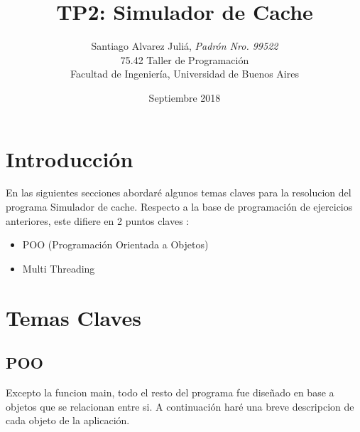 \documentclass[a4paper,12pt]{report}
\title{	TP2: Simulador de Cache}
\author{	Santiago Alvarez Juli\'a, \textit{Padr\'on Nro. 99522}                     \\
            \normalsize{75.42 Taller de Programaci\'on}                             \\
            \normalsize{Facultad de Ingenier\'ia, Universidad de Buenos Aires}            \\
       }
\date{Septiembre 2018}
\begin{document}
\maketitle

\thispagestyle{empty}

\tableofcontents
\newpage
{}

\section{Introducci\'on}

En las siguientes secciones abordar\'e algunos temas claves para la resolucion del programa Simulador de cache. Respecto a la base de programaci\'on de ejercicios anteriores, este difiere en 2 puntos claves :

\begin{itemize}
\item POO (Programaci\'on Orientada a Objetos)
\item Multi Threading
\end{itemize}


\section{Temas Claves}

\subsection{POO}

Excepto la funcion main, todo el resto del programa fue dise\~nado en base a objetos que se relacionan entre si. A continuaci\'on har\'e una breve descripcion de cada objeto de la aplicaci\'on.
\end{document}
